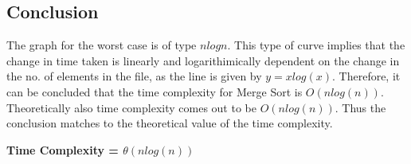\documentclass{article}
\begin{document}
\subsection{Conclusion}
The graph for the worst case is of type $nlogn$. This type of curve implies that
the change in time taken is linearly and logarithimically dependent on the change in the no. of elements in the file,
as the line is given by $y = xlog(x)$.
Therefore, it can be concluded that the time complexity for Merge Sort is $O(nlog(n))$.
Theoretically also time complexity comes out to be $O(nlog(n))$. Thus the conclusion matches to the theoretical
value of the time complexity.

\textbf{Time Complexity = $\theta(nlog(n))$}
\end{document}
